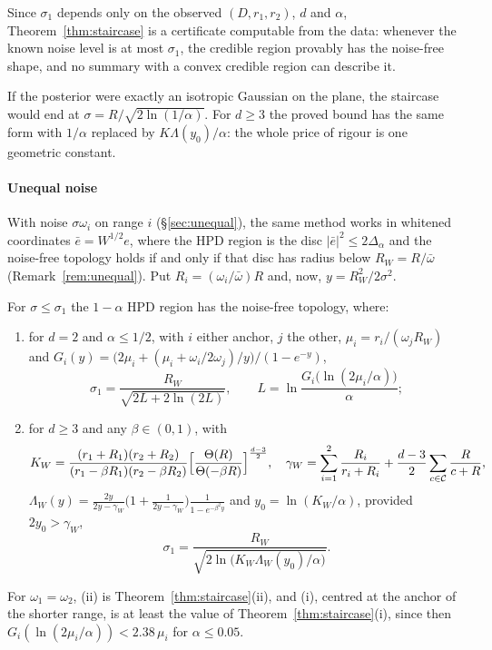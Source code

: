 Since $\sigma_1$ depends only on the observed $(D, r_1, r_2)$, $d$ and $\alpha$, Theorem~\ref{thm:staircase} is a certificate
computable from the data: whenever the known noise level is at most $\sigma_1$, the credible region provably has the
noise-free shape, and no summary with a convex credible region can describe it.

If the posterior were exactly an isotropic Gaussian on the plane, the staircase would end at
$\sigma = R/\sqrt{2\ln(1/\alpha)}$. For $d \ge 3$ the proved bound has the same form with $1/\alpha$ replaced by
$K\Lambda(y_0)/\alpha$: the whole price of rigour is one geometric constant.

\paragraph{Unequal noise} With noise $\sigma \omega_i$ on range $i$ (\S\ref{sec:unequal}), the same method works in whitened
coordinates $\bar e = W^{1/2}e$, where the HPD region is the disc $|\bar e|^2 \le 2\Delta_\alpha$ and the
noise-free topology holds if and only if that disc has radius below $R_W = R/\bar\omega$ (Remark~\ref{rem:unequal}). Put
$R_i = (\omega_i/\bar\omega)R$ and, now, $y = R_W^2/2\sigma^2$.

\begin{theorem}\label{thm:staircaseW}
For $\sigma \le \sigma_1$ the $1 - \alpha$ HPD region has the noise-free topology, where:
\begin{enumerate}[label=(\roman*)]
\item for $d = 2$ and $\alpha \le 1/2$, with $i$ either anchor, $j$ the other, $\mu_i = r_i/(\omega_jR_W)$ and
$G_i(y) = \bigl(2\mu_i + (\mu_i + \omega_i/2\omega_j)/y\bigr)/(1 - e^{-y})$,
\[ \sigma_1 = \frac{R_W}{\sqrt{2L + 2\ln(2L)}}, \qquad L = \ln\frac{G_i\bigl(\ln(2\mu_i/\alpha)\bigr)}{\alpha}; \]
\item for $d \ge 3$ and any $\beta \in (0,1)$, with
\[ K_W = \frac{(r_1 + R_1)(r_2 + R_2)}{(r_1 - \beta R_1)(r_2 - \beta R_2)}\Bigl[\frac{\Theta(R)}{\Theta(-\beta R)}\Bigr]^{\frac{d-3}{2}}, \quad
   \gamma_W = \sum_{i=1}^2\frac{R_i}{r_i + R_i} + \frac{d-3}{2}\sum_{c \in \mathcal C}\frac{R}{c + R}, \]
$\Lambda_W(y) = \frac{2y}{2y - \gamma_W}\bigl(1 + \frac{1}{2y - \gamma_W}\bigr)\frac{1}{1 - e^{-\beta^2 y}}$ and
$y_0 = \ln(K_W/\alpha)$, provided $2y_0 > \gamma_W$,
\[ \sigma_1 = \frac{R_W}{\sqrt{2\ln\bigl(K_W\Lambda_W(y_0)/\alpha\bigr)}} . \]
\end{enumerate}
For $\omega_1 = \omega_2$, (ii) is Theorem~\ref{thm:staircase}(ii), and (i), centred at the anchor of the shorter range, is at
least the value of Theorem~\ref{thm:staircase}(i), since then $G_i(\ln(2\mu_i/\alpha)) < 2.38\,\mu_i$ for $\alpha \le 0.05$.
\end{theorem}

